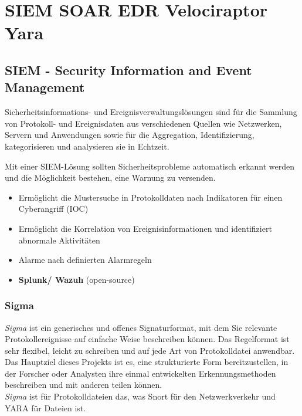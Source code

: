 

\section{SIEM SOAR EDR Velociraptor Yara}

\subsection{SIEM - Security Information and Event Management}
Sicherheitsinformations- und Ereignisverwaltungslösungen sind für die Sammlung von Protokoll- und Ereignisdaten aus verschiedenen Quellen wie Netzwerken, Servern und Anwendungen sowie für die Aggregation, Identifizierung, kategorisieren und analysieren sie in Echtzeit.

Mit einer SIEM-Lösung sollten Sicherheitsprobleme automatisch erkannt werden und die Möglichkeit bestehen, eine Warnung zu versenden.\\

\begin{itemize}
    \item Ermöglicht die Mustersuche in Protokolldaten nach Indikatoren für einen Cyberangriff (IOC)
    \item Ermöglicht die Korrelation von Ereignisinformationen und identifiziert abnormale Aktivitäten
    \item Alarme nach definierten Alarmregeln
    \item \textbf{Splunk/ Wazuh} (open-source)
\end{itemize}

\subsubsection{Sigma}
\textit{Sigma} ist ein generisches und offenes Signaturformat, mit dem Sie relevante Protokollereignisse auf einfache Weise beschreiben können. Das Regelformat ist sehr flexibel, leicht zu schreiben und auf jede Art von Protokolldatei anwendbar. Das Hauptziel dieses Projekts ist es, eine strukturierte Form bereitzustellen, in der Forscher oder Analysten ihre einmal entwickelten Erkennungsmethoden beschreiben und mit anderen teilen können.\\

\textit{Sigma} ist für Protokolldateien das, was Snort für den Netzwerkverkehr und YARA für Dateien ist.\\

